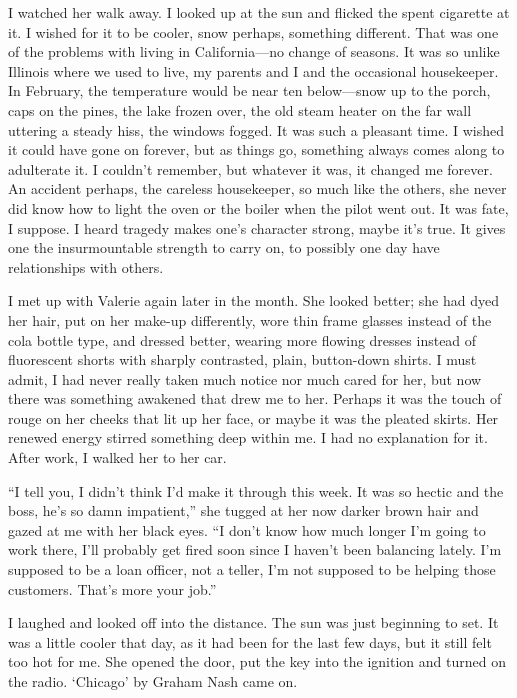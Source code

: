 I watched her walk away. I looked up at the sun and flicked the spent
cigarette at it. I wished for it to be cooler, snow perhaps, something
different. That was one of the problems with living in California---no
change of seasons. It was so unlike Illinois where we used to live, my
parents and I and the occasional housekeeper. In February, the
temperature would be near ten below---snow up to the porch, caps on the
pines, the lake frozen over, the old steam heater on the far wall
uttering a steady hiss, the windows fogged. It was such a pleasant time.
I wished it could have gone on forever, but as things go, something
always comes along to adulterate it. I couldn't remember, but whatever
it was, it changed me forever. An accident perhaps, the careless
housekeeper, so much like the others, she never did know how to light
the oven or the boiler when the pilot went out. It was fate, I suppose.
I heard tragedy makes one's character strong, maybe it's true. It gives
one the insurmountable strength to carry on, to possibly one day have
relationships with others.

I met up with Valerie again later in the month. She looked better; she
had dyed her hair, put on her make-up differently, wore thin frame
glasses instead of the cola bottle type, and dressed better, wearing
more flowing dresses instead of fluorescent shorts with sharply
contrasted, plain, button-down shirts. I must admit, I had never really
taken much notice nor much cared for her, but now there was something
awakened that drew me to her. Perhaps it was the touch of rouge on her
cheeks that lit up her face, or maybe it was the pleated skirts. Her
renewed energy stirred something deep within me. I had no explanation
for it. After work, I walked her to her car.

``I tell you, I didn't think I'd make it through this week. It was so
hectic and the boss, he's so damn impatient,'' she tugged at her now
darker brown hair and gazed at me with her black eyes. ``I don't know
how much longer I'm going to work there, I'll probably get fired soon
since I haven't been balancing lately. I'm supposed to be a loan
officer, not a teller, I'm not supposed to be helping those customers.
That's more your job.''

I laughed and looked off into the distance. The sun was just beginning
to set. It was a little cooler that day, as it had been for the last few
days, but it still felt too hot for me. She opened the door, put the key
into the ignition and turned on the radio. `Chicago' by Graham Nash came
on.

